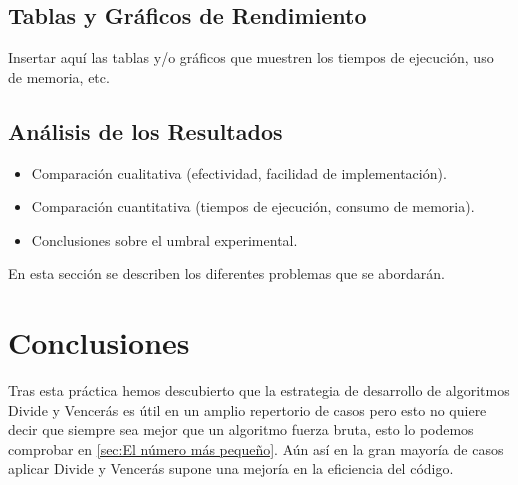 \documentclass[a4paper,12pt]{article}
\begin{document}
\subsection{Tablas y Gráficos de Rendimiento}
Insertar aquí las tablas y/o gráficos que muestren los tiempos de ejecución,
uso de memoria, etc.

\subsection{Análisis de los Resultados}
\begin{itemize}
	\item Comparación cualitativa (efectividad, facilidad de implementación).
	\item Comparación cuantitativa (tiempos de ejecución, consumo de memoria).
	\item Conclusiones sobre el umbral experimental.
\end{itemize}

En esta sección se describen los diferentes problemas que se abordarán.

\section{Conclusiones}
Tras esta práctica hemos descubierto que la estrategia de desarrollo de algoritmos Divide y Vencerás es útil en un amplio repertorio de casos pero esto no quiere decir que siempre sea mejor que un algoritmo fuerza bruta, esto lo podemos comprobar en \ref{sec:El número más pequeño}. Aún así en la gran mayoría de casos aplicar Divide y Vencerás 
supone una mejoría en la eficiencia del código.
\end{document}
